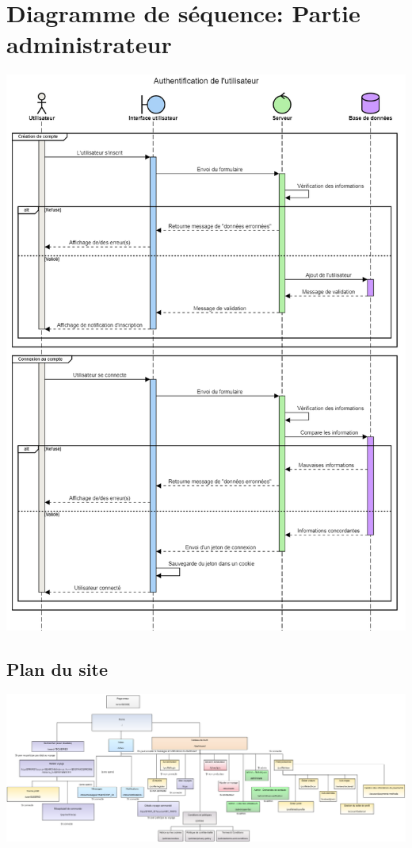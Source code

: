 \section{Diagramme de séquence: Partie administrateur}
\label{Diagramme de séquence: Partie administrateur}
\begin{center}
\includegraphics[width=\linewidth]{medias/seqAuth.png}
\end{center}

\begin{landscape}
\section{Plan du site}
\label{Plan du site}
\begin{center}
\includegraphics[width=\linewidth]{medias/sitemap.png}
\end{center}
\end{landscape}

